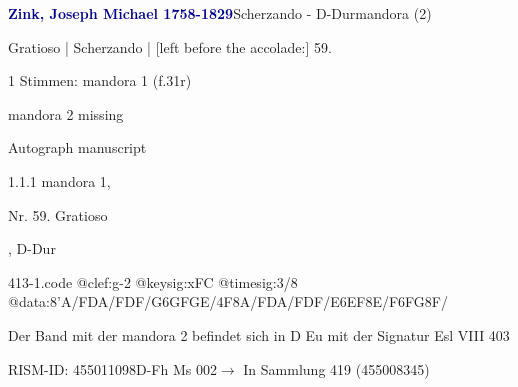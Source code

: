 \documentclass[twocolumn, 12pt]{book}
\begin{document}
\par \vspace{16pt} \textcolor{darkblue}{\textbf{Zink, Joseph Michael  1758-1829}}\hfillplus{\textbf{[413]}}\newline Scherzando - D-Dur\newline mandora (2)
\par \begin{itshape}[f.31r, at left:] Gratioso | Scherzando | [left before the accolade:] 59.\end{itshape} 
\par \textcolor{darkblue}{}  1 Stimmen: mandora 1  (f.31r)\newline \begin{small} mandora 2 missing\end{small} \newline Autograph manuscript
\par 1.1.1  mandora 1, \begin{itshape}Nr. 59. Gratioso\end{itshape}, D-Dur  
\begin{filecontents*}{413-1.code}
@clef:g-2
@keysig:xFC
@timesig:3/8
@data:8'A/FDA/FDF/{G6GFGE}/4F8A/FDA/FDF/{E6EF8E}/{F6FG8F}/
\end{filecontents*}
\newline %
\par Der Band mit der mandora 2 befindet sich in D Eu mit der Signatur Esl VIII 403
\par RISM-ID: 455011098\newline D-Fh  Ms 002\newline $\rightarrow$ In Sammlung 419 (455008345)
      
\end{document}
